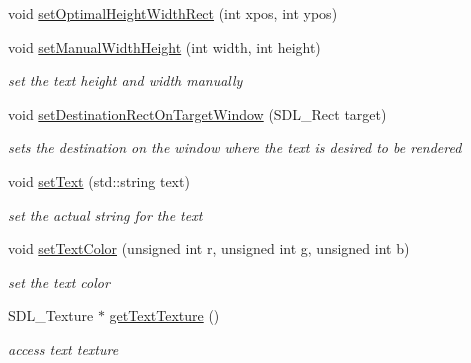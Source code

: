 \begin{DoxyCompactItemize}
void \hyperlink{class_text_aaef691045004d8c9ad3106d43421d46e}{set\+Optimal\+Height\+Width\+Rect} (int xpos, int ypos)
\item 
\hypertarget{class_text_a9bfd21da6d85f2f86d2fc991f0fd625f}{}\label{class_text_a9bfd21da6d85f2f86d2fc991f0fd625f} 
void \hyperlink{class_text_a9bfd21da6d85f2f86d2fc991f0fd625f}{set\+Manual\+Width\+Height} (int width, int height)
\begin{DoxyCompactList}\small\item\em set the text height and width manually \end{DoxyCompactList}\item 
\hypertarget{class_text_ae407c3faf10a038714bfc6b481ba208f}{}\label{class_text_ae407c3faf10a038714bfc6b481ba208f} 
void \hyperlink{class_text_ae407c3faf10a038714bfc6b481ba208f}{set\+Destination\+Rect\+On\+Target\+Window} (S\+D\+L\+\_\+\+Rect target)
\begin{DoxyCompactList}\small\item\em sets the destination on the window where the text is desired to be rendered \end{DoxyCompactList}\item 
\hypertarget{class_text_ab2d8c95b3d746ae3e8c0fba8318743c9}{}\label{class_text_ab2d8c95b3d746ae3e8c0fba8318743c9} 
void \hyperlink{class_text_ab2d8c95b3d746ae3e8c0fba8318743c9}{set\+Text} (std\+::string text)
\begin{DoxyCompactList}\small\item\em set the actual string for the text \end{DoxyCompactList}\item 
\hypertarget{class_text_a2ffd90af8ef2d428715437fb1b980bc0}{}\label{class_text_a2ffd90af8ef2d428715437fb1b980bc0} 
void \hyperlink{class_text_a2ffd90af8ef2d428715437fb1b980bc0}{set\+Text\+Color} (unsigned int r, unsigned int g, unsigned int b)
\begin{DoxyCompactList}\small\item\em set the text color \end{DoxyCompactList}\item 
\hypertarget{class_text_abfa39621a11807a010d3878f9e623b8b}{}\label{class_text_abfa39621a11807a010d3878f9e623b8b} 
S\+D\+L\+\_\+\+Texture $\ast$ \hyperlink{class_text_abfa39621a11807a010d3878f9e623b8b}{get\+Text\+Texture} ()
\begin{DoxyCompactList}\small\item\em access text texture \end{DoxyCompactList}\item 

\end{DoxyCompactItemize}
